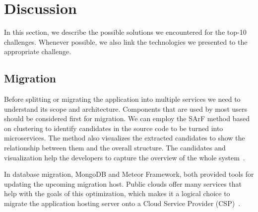 
\section{Discussion}\label{sec:discussion}

In this section, we describe the possible solutions we encountered for the top-10 challenges. Whenever possible, we also link the technologies we presented to the appropriate challenge. %

\subsection{Migration}%

Before splitting or migrating the application into multiple services we need to understand its scope and architecture. Components that are used by most users should be considered first for migration. 
%
We can employ the SArF method based on clustering to identify candidates in the source code to be turned into microservices. The method also visualizes the extracted candidates to show the relationship between them and the overall structure. The candidates and visualization help the developers to capture the overview of the whole system~\cite{Kamimura2018}.

In database migration, MongoDB and Meteor Framework, both provided tools for updating the upcoming migration host. Public clouds offer many services that help with the goals of this optimization, which makes it a logical choice to migrate the application hosting server onto a Cloud Service Provider (CSP)~\cite{Tuuli2020}. %


